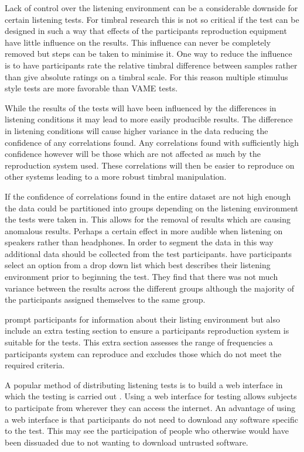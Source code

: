 			Lack of control over the listening environment can be a considerable downside for certain listening
			tests.  For timbral research this is not so critical if the test can be designed in such a way that
			effects of the participants reproduction equipment have little influence on the results. This
			influence can never be completely removed but steps can be taken to minimise it. One way to reduce
			the influence is to have participants rate the relative timbral difference between samples rather
			than give absolute ratings on a timbral scale. For this reason multiple stimulus style tests are
			more favorable than VAME tests.

			While the results of the tests will have been influenced by the differences in listening conditions
			it may lead to more easily producible results. The difference in listening conditions will cause
			higher variance in the data reducing the confidence of any correlations found. Any correlations
			found with sufficiently high confidence however will be those which are not affected as much by the
			reproduction system used. These correlations will then be easier to reproduce on other systems
			leading to a more robust timbral manipulation.

			If the confidence of correlations found in the entire dataset are not high enough the data could be
			partitioned into groups depending on the listening environment the tests were taken in. This allows
			for the removal of results which are causing anomalous results. Perhaps a certain effect in more
			audible when listening on speakers rather than headphones. In order to segment the data in this way
			additional data should be collected from the test participants.  \citet{wilmering2013audio} have
			participants select an option from a drop down list which best describes their listening environment
			prior to beginning the test.  They find that there was not much variance between the results across
			the different groups although the majority of the participants assigned themselves to the same
			group.

			\citet{seetharaman2014crowdsourcing} prompt participants for information about their listing
			environment but also include an extra testing section to ensure a participants reproduction system
			is suitable for the tests. This extra section assesses the range of frequencies a participants
			system can reproduce and excludes those which do not meet the required criteria.
			
			A popular method of distributing listening tests is to build a web interface in which the
			testing is carried out \citep{wilmering2013audio, cartwright2013socialeq,
			seetharaman2014crowdsourcing}. Using a web interface for testing allows subjects to
			participate from wherever they can access the internet. An advantage of using a web
			interface is that participants do not need to download any software specific to the test.
			This may see the participation of people who otherwise would have been dissuaded due to not
			wanting to download untrusted software.


